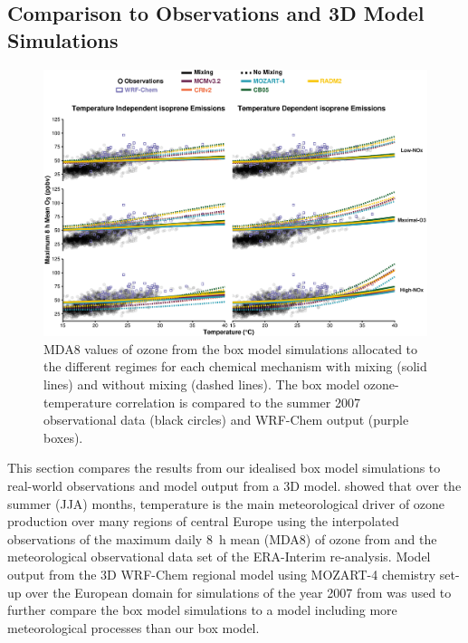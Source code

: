 \subsection{Comparison to Observations and 3D Model Simulations} \label{ss:r_observations}
\begin{figure}[t]%
    \centering%
    \caption{MDA8 values of ozone from the box model simulations allocated to the different  regimes for each chemical mechanism with mixing (solid lines) and without mixing (dashed lines). The box model ozone-temperature correlation is compared to the summer 2007 observational data (black circles) and WRF-Chem output (purple boxes).}%
    \label{f:comparison}%
    \vspace{2mm}%
    \includegraphics[height=0.43\textheight]{img/Germany_O3-T_ERA_WRF_2007}%
\end{figure}

\begin{table}[t]%
    \centering%
    \caption{Slopes (m$_{\text{O3-T}}$, ppbv per \degree C) of the linear fit to MDA8 values of ozone and temperature correlations in Fig.~\ref{f:comparison}, indicating the increase of MDA8 in ppbv of ozone per \degree C. The slope of the observational data is $2.15$~ppbv/\degree C and the slope of the WRF-Chem output is $2.05$~ppbv/\degree C.}%
    \label{t:mo3-t}%
    \vspace{2mm}
    \vspace{-4mm}
\end{table} 

This section compares the results from our idealised box model simulations to real-world observations and model output from a 3D model.
\citet{Otero:2016} showed that over the summer (JJA) months, temperature is the main meteorological driver of ozone production over many regions of central Europe using the interpolated observations of the maximum daily 8~h mean (MDA8) of ozone from \citet{Schnell:2015} and the meteorological observational data set of the ERA-Interim re-analysis.
Model output from the 3D WRF-Chem regional model using MOZART-4 chemistry set-up over the European domain for simulations of the year 2007 from \citet{Mar:2016} was used to further compare the box model simulations to a model including more meteorological processes than our box model.

